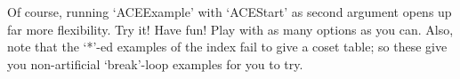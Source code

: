 Of course, running `ACEExample' with  `ACEStart'  as  second  argument
opens up far more flexibility. Try it! Have fun!  Play  with  as  many
options as you can. Also, note that the `*'-ed examples of  the  index
fail  to  give  a  coset  table;  so  these  give  you  non-artificial
`break'-loop examples for you to try.

